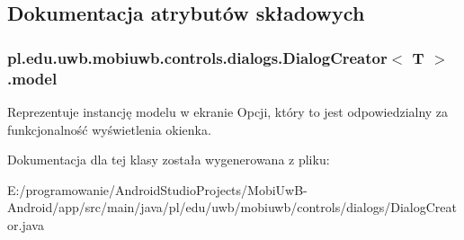 \subsection{Dokumentacja atrybutów składowych}
\hypertarget{classpl_1_1edu_1_1uwb_1_1mobiuwb_1_1controls_1_1dialogs_1_1_dialog_creator_a3a75c0177796683d1ea9fc8580f48262}{}
\subsubsection[{model}]{ {\bf pl.\+edu.\+uwb.\+mobiuwb.\+controls.\+dialogs.\+Dialog\+Creator}$<$ T $>$.model\hspace{0.3cm}{\ttfamily [protected]}}\label{classpl_1_1edu_1_1uwb_1_1mobiuwb_1_1controls_1_1dialogs_1_1_dialog_creator_a3a75c0177796683d1ea9fc8580f48262}
Reprezentuje instancję modelu w ekranie Opcji, który to jest odpowiedzialny za funkcjonalność wyświetlenia okienka. 

Dokumentacja dla tej klasy została wygenerowana z pliku\+:\begin{DoxyCompactItemize}
\item 
E\+:/programowanie/\+Android\+Studio\+Projects/\+Mobi\+Uw\+B-\/\+Android/app/src/main/java/pl/edu/uwb/mobiuwb/controls/dialogs/Dialog\+Creator.\+java\end{DoxyCompactItemize}
